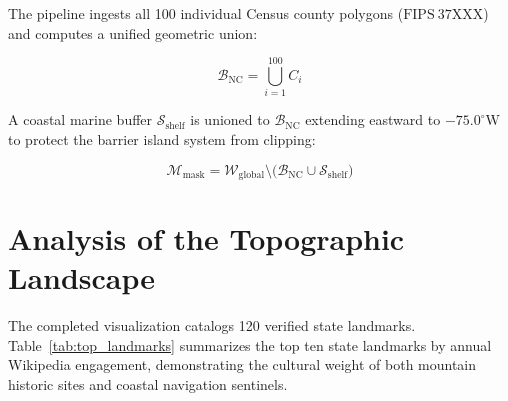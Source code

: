 \documentclass[11pt,letterpaper]{article}
\begin{document}
The pipeline ingests all 100 individual Census county polygons ($\mathrm{FIPS\ 37XXX}$) and computes a unified geometric union:

\begin{equation}
\mathcal{B}_{\text{NC}} = \bigcup_{i=1}^{100} C_i
\end{equation}

A coastal marine buffer $\mathcal{S}_{\text{shelf}}$ is unioned to $\mathcal{B}_{\text{NC}}$ extending eastward to $-75.0^\circ\mathrm{W}$ to protect the barrier island system from clipping:

\begin{equation}
\mathcal{M}_{\text{mask}} = \mathcal{W}_{\text{global}} \setminus \Big( \mathcal{B}_{\text{NC}} \cup \mathcal{S}_{\text{shelf}} \Big)
\end{equation}

\section{Analysis of the Topographic Landscape}

The completed visualization catalogs 120 verified state landmarks. Table~\ref{tab:top_landmarks} summarizes the top ten state landmarks by annual Wikipedia engagement, demonstrating the cultural weight of both mountain historic sites and coastal navigation sentinels.
\end{document}
